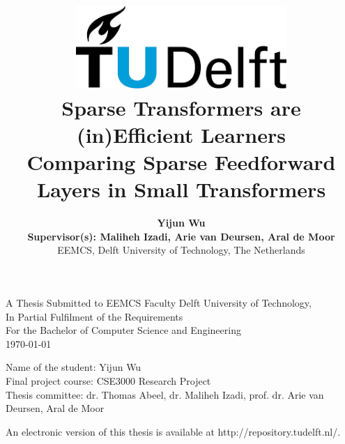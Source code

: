 \title{
    \includegraphics[width=8cm, keepaspectratio]{tudelftlogo.png}\\
    \vspace*{2cm}
    \textbf{
        Sparse Transformers are (in)Efficient Learners\\
        {\large Comparing Sparse Feedforward Layers in Small Transformers}
    }\\
    \vspace*{1cm}
}

\author{
     \textbf{
Yijun Wu}\\
    \hfill \break
    \textbf{Supervisor(s): Maliheh Izadi, Arie van Deursen, Aral de Moor}\\
    \break
    {\large 
        \hfill \break
        EEMCS, Delft University of Technology, The Netherlands
    }\\
}

\date{}

\maketitle
\thispagestyle{empty}

\let\clearpagebackup\clearpage
\renewcommand{\clearpage}{ }

\onecolumn

\vspace*{1.5cm}
\begin{center}
    A Thesis Submitted to EEMCS Faculty Delft University of Technology,\\
    In Partial Fulfilment of the Requirements\\
    For the Bachelor of Computer Science and Engineering\\
    \today
\end{center}

\vspace*{2cm}

\noindent
{\small
Name of the student: Yijun Wu\\
Final project course: CSE3000 Research Project\\
Thesis committee: dr. Thomas Abeel, dr. Maliheh Izadi, prof. dr. Arie van Deursen, Aral de Moor\\
}
\vfill

\begin{center}
    An electronic version of this thesis is available at http://repository.tudelft.nl/.
\end{center}

\twocolumn
\let\clearpage\clearpagebackup  
\clearpage
\setcounter{page}{1}
